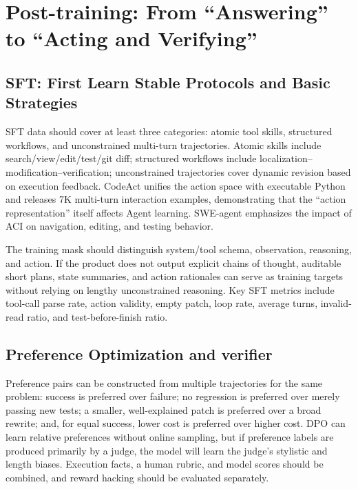 \documentclass[10pt,a4paper,UTF8,fontset=none]{ctexart}
\begin{document}
\section{Post-training: From ``Answering'' to ``Acting and Verifying''}

\subsection{SFT: First Learn Stable Protocols and Basic Strategies}

SFT data should cover at least three categories: atomic tool skills, structured workflows, and unconstrained multi-turn trajectories. Atomic skills include search/view/edit/test/git diff; structured workflows include localization--modification--verification; unconstrained trajectories cover dynamic revision based on execution feedback. CodeAct unifies the action space with executable Python and releases 7K multi-turn interaction examples, demonstrating that the ``action representation'' itself affects Agent learning\cite{en:wang2024codeact}. SWE-agent emphasizes the impact of ACI on navigation, editing, and testing behavior\cite{en:yang2024sweagent}.

The training mask should distinguish system/tool schema, observation, reasoning, and action. If the product does not output explicit chains of thought, auditable short plans, state summaries, and action rationales can serve as training targets without relying on lengthy unconstrained reasoning. Key SFT metrics include tool-call parse rate, action validity, empty patch, loop rate, average turns, invalid-read ratio, and test-before-finish ratio.

\subsection{Preference Optimization and verifier}

Preference pairs can be constructed from multiple trajectories for the same problem: success is preferred over failure; no regression is preferred over merely passing new tests; a smaller, well-explained patch is preferred over a broad rewrite; and, for equal success, lower cost is preferred over higher cost. DPO can learn relative preferences without online sampling, but if preference labels are produced primarily by a judge, the model will learn the judge's stylistic and length biases. Execution facts, a human rubric, and model scores should be combined, and reward hacking should be evaluated separately.
\end{document}
